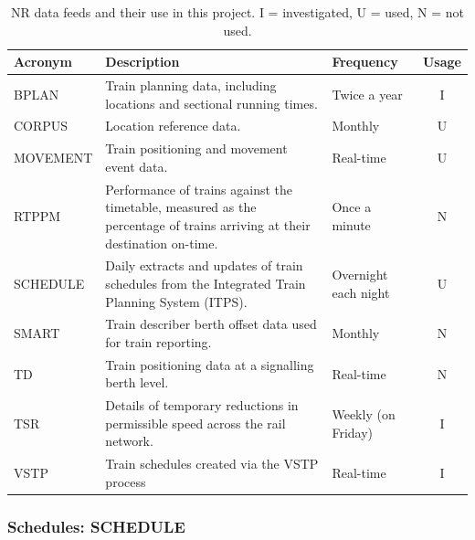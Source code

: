 \documentclass[12pt,a4paper]{article}
\begin{document}
\begin{table}[htb]
\centering
\caption{NR data feeds and their use in this project. I = investigated, U = used, N = not used.}
\label{table:nr_feeds}
\begin{tabular}{|l|p{9cm}|p{2cm}|c|}
\hline
\textbf{Acronym} & \textbf{Description} & \textbf{Frequency} & \multicolumn{1}{l|}{\textbf{Usage}} \\ \hline
BPLAN & Train planning data, including locations and sectional running times. & Twice a year & I \\ \hline
CORPUS & Location reference data. & Monthly & U \\ \hline
MOVEMENT & Train positioning and movement event data. & Real-time & U \\ \hline
RTPPM & Performance of trains against the timetable, measured as the percentage of trains arriving at their destination on-time. & Once a minute         & N \\ \hline
SCHEDULE         & Daily extracts and updates of train schedules from the Integrated Train Planning System (ITPS).                          & Overnight each night  & U                                       \\ \hline
SMART            & Train describer berth offset data used for train reporting.                                                              & Monthly               & N                                       \\ \hline
TD               & Train positioning data at a signalling berth level.                                                                      & Real-time             & N                                       \\ \hline
TSR              & Details of temporary reductions in permissible speed across the rail network.                                            & Weekly (on Friday) & I                                       \\ \hline
VSTP             & Train schedules created via the VSTP process                                                                             & Real-time             & I                                       \\ \hline
\end{tabular}
\end{table}

\subsubsection{Schedules: SCHEDULE}
\end{document}
